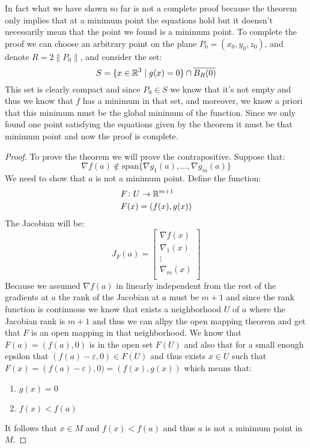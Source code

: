 \documentclass[11pt,a4paper]{article}
\begin{document}
	\newpage
	
	In fact what we have shown so far is not a complete proof because
	the theorem only implies that at a minimum point the equations hold
	but it doensn't necessarily mean that the point we found is a minimum
	point. To complete the proof we can choose an arbitrary point on the
	plane $P_0 = (x_0,y_0,z_0)$, and denote $R = 2\|P_0\|$, and consider
	the set:
	\[
		S = \{x \in \mathbb{R}^3 \mid g(x) = 0\} \cap \overline{B_R(0)}
	\]
	This set is clearly compact and since $P_0 \in S$ we know that it's not 
	empty and thus we know that $f$ has a minimum in that set, and moreover,
	we know a priori that this minimum must be the global minimum of the
	function. Since we only found one point satisfying the equations given
	by the theorem it must be that minimum point and now the proof is 
	complete.
	
	\begin{proof}
		To prove the theorem we will prove the contrapositive. Suppose that:
		\[
			\nabla f(a) \notin 
			\mathrm{span}\{\nabla g_1(a),\dots,\nabla g_m(a)\}
		\]
		We need to show that $a$ is not a minimum point. Define the function:
		\begin{align*}
			&F \colon U \to \mathbb{R}^{m+1} \\
			&F(x) = (f(x),g(x))
		\end{align*}
		The Jacobian will be:
		\[
		J_F(a) = 
			\begin{bmatrix}
				\nabla f(x)\\
				\nabla_1(x)\\
				\vdots\\
				\nabla_m(x)\\
			\end{bmatrix}
		\]
		Because we assumed $\nabla f(a)$ in linearly independent from the
		rest of the gradients at $a$ the rank of the Jacobian at $a$ must
		be $m + 1$ and since the rank function is continuous we know that
		exists a neighborhood $U$ of $a$ where the Jacobian rank is $m + 1$
		and thus we can allpy the open mapping theorem and get that $F$
		is an open mapping in that neighborhood. We know that 
		$F(a) = (f(a), 0)$ is in the open set $F(U)$ and also that for a small
		enough epsilon that $(f(a) - \varepsilon, 0) \in F(U)$ and thus
		exists $x \in U$ such that 
		$F(x) = (f(a) - \varepsilon), 0) = (f(x), g(x))$ which means that:
		\begin{enumerate}
			\item $g(x) = 0$
			\item $f(x) < f(a)$
		\end{enumerate}
		It follows that $x \in M$ and $f(x) < f(a)$ and thus $a$ is not
		a minimum point in $M$.
	\end{proof}
	
\end{document}
